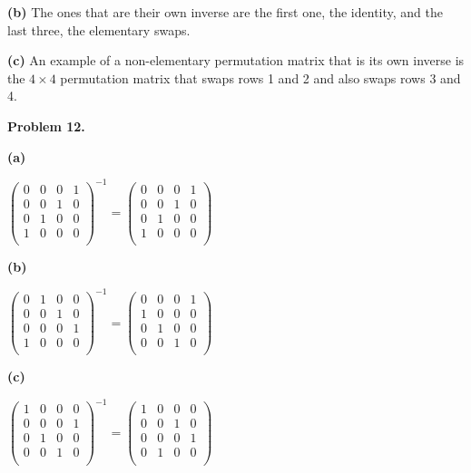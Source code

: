 \documentclass[oneside,12pt]{amsart}
\begin{document}
\textbf{(b)} The ones that are their own inverse are the first one, the
identity, and the last three, the elementary swaps.

\bigskip

\textbf{(c)} An example of a non-elementary permutation matrix that is
its own inverse is the $4\times 4$ permutation matrix that swaps
rows 1 and 2 and also swaps rows 3 and 4.

\bigskip

\textbf{Problem 12.}

\textbf{(a)}

$
\begin{pmatrix}
0 & 0 & 0 & 1 \\
0 & 0 & 1 & 0 \\
0 & 1 & 0 & 0 \\
1 & 0 & 0 & 0 \\
\end{pmatrix}^{-1}=
\begin{pmatrix}
0 & 0 & 0 & 1 \\
0 & 0 & 1 & 0 \\
0 & 1 & 0 & 0 \\
1 & 0 & 0 & 0 \\
\end{pmatrix}
$

\bigskip

\textbf{(b)}

$
\begin{pmatrix}
0 & 1 & 0 & 0 \\
0 & 0 & 1 & 0 \\
0 & 0 & 0 & 1 \\
1 & 0 & 0 & 0 \\
\end{pmatrix}^{-1}=
\begin{pmatrix}
0 & 0 & 0 & 1 \\
1 & 0 & 0 & 0 \\
0 & 1 & 0 & 0 \\
0 & 0 & 1 & 0 \\
\end{pmatrix}
$

\bigskip

\textbf{(c)}

$
\begin{pmatrix}
1 & 0 & 0 & 0 \\
0 & 0 & 0 & 1 \\
0 & 1 & 0 & 0 \\
0 & 0 & 1 & 0 \\
\end{pmatrix}^{-1}=
\begin{pmatrix}
1 & 0 & 0 & 0 \\
0 & 0 & 1 & 0 \\
0 & 0 & 0 & 1 \\
0 & 1 & 0 & 0 \\
\end{pmatrix}
$
\end{document}
